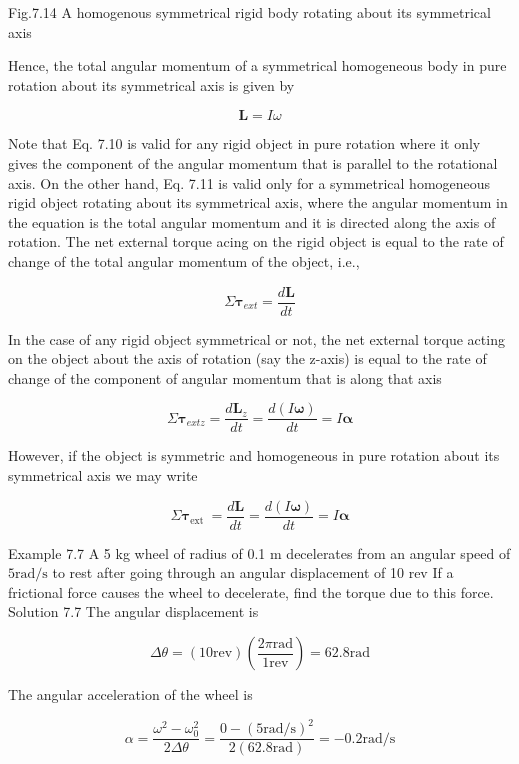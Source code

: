 \documentclass[10pt]{article}
\begin{document}
Fig.7.14 A homogenous symmetrical rigid body rotating about its symmetrical axis

Hence, the total angular momentum of a symmetrical homogeneous body in pure rotation about its symmetrical axis is given by


\begin{equation*}
\mathbf{L}=I \omega \tag{7.11}
\end{equation*}


Note that Eq. 7.10 is valid for any rigid object in pure rotation where it only gives the component of the angular momentum that is parallel to the rotational axis. On the other hand, Eq. 7.11 is valid only for a symmetrical homogeneous rigid object rotating about its symmetrical axis, where the angular momentum in the equation is the total angular momentum and it is directed along the axis of rotation. The net external torque acing on the rigid object is equal to the rate of change of the total angular momentum of the object, i.e.,

$$
\Sigma \boldsymbol{\tau}_{e x t}=\frac{d \mathbf{L}}{d t}
$$

In the case of any rigid object symmetrical or not, the net external torque acting on the object about the axis of rotation (say the z-axis) is equal to the rate of change of the component of angular momentum that is along that axis

$$
\Sigma \boldsymbol{\tau}_{e x t z}=\frac{d \mathbf{L}_{z}}{d t}=\frac{d(I \boldsymbol{\omega})}{d t}=I \boldsymbol{\alpha}
$$

However, if the object is symmetric and homogeneous in pure rotation about its symmetrical axis we may write

$$
\Sigma \boldsymbol{\tau}_{\text {ext }}=\frac{d \mathbf{L}}{d t}=\frac{d(I \boldsymbol{\omega})}{d t}=I \boldsymbol{\alpha}
$$

Example 7.7 A 5 kg wheel of radius of 0.1 m decelerates from an angular speed of $5 \mathrm{rad} / \mathrm{s}$ to rest after going through an angular displacement of 10 rev If a frictional force causes the wheel to decelerate, find the torque due to this force.\\
Solution 7.7 The angular displacement is

$$
\Delta \theta=(10 \mathrm{rev})\left(\frac{2 \pi \mathrm{rad}}{1 \mathrm{rev}}\right)=62.8 \mathrm{rad}
$$

The angular acceleration of the wheel is

$$
\alpha=\frac{\omega^{2}-\omega_{0}^{2}}{2 \Delta \theta}=\frac{0-(5 \mathrm{rad} / \mathrm{s})^{2}}{2(62.8 \mathrm{rad})}=-0.2 \mathrm{rad} / \mathrm{s}
$$
\end{document}
